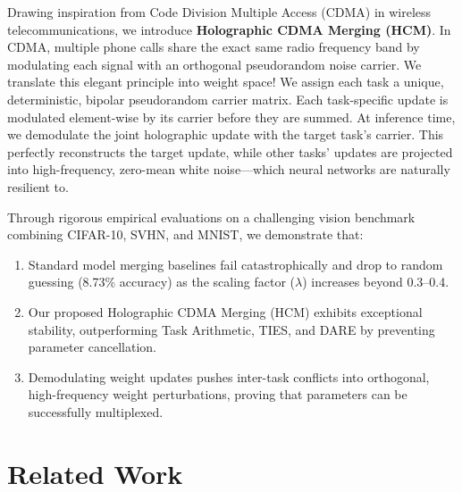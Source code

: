 \documentclass{article}
\begin{document}
Drawing inspiration from Code Division Multiple Access (CDMA) in wireless telecommunications, we introduce \textbf{Holographic CDMA Merging (HCM)}. In CDMA, multiple phone calls share the exact same radio frequency band by modulating each signal with an orthogonal pseudorandom noise carrier. We translate this elegant principle into weight space! We assign each task a unique, deterministic, bipolar pseudorandom carrier matrix. Each task-specific update is modulated element-wise by its carrier before they are summed. At inference time, we demodulate the joint holographic update with the target task's carrier. This perfectly reconstructs the target update, while other tasks' updates are projected into high-frequency, zero-mean white noise—which neural networks are naturally resilient to.

Through rigorous empirical evaluations on a challenging vision benchmark combining CIFAR-10, SVHN, and MNIST, we demonstrate that:
\begin{enumerate}
    \item Standard model merging baselines fail catastrophically and drop to random guessing (8.73\% accuracy) as the scaling factor ($\lambda$) increases beyond 0.3--0.4.
    \item Our proposed Holographic CDMA Merging (HCM) exhibits exceptional stability, outperforming Task Arithmetic, TIES, and DARE by preventing parameter cancellation.
    \item Demodulating weight updates pushes inter-task conflicts into orthogonal, high-frequency weight perturbations, proving that parameters can be successfully multiplexed.
\end{enumerate}

\section{Related Work}
\label{sec:related}
\end{document}

